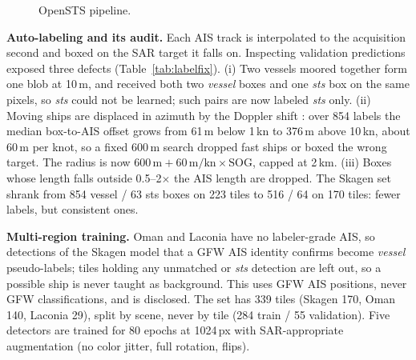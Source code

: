 \documentclass[conference]{IEEEtran}
\begin{document}
\begin{figure}[t]
\centering
{}
\caption{OpenSTS pipeline.}
\label{fig:pipeline}
\end{figure}

\textbf{Auto-labeling and its audit.} Each AIS track is interpolated to the acquisition
second and boxed on the SAR target it falls on. Inspecting validation predictions
exposed three defects (Table~\ref{tab:labelfix}). (i) Two vessels moored together form
one blob at 10\,m, and received both two \emph{vessel} boxes and one \emph{sts} box on
the same pixels, so \emph{sts} could not be learned; such pairs are now labeled
\emph{sts} only. (ii) Moving ships are displaced in azimuth by the Doppler shift
\cite{raney1971}: over 854 labels the median box-to-AIS offset grows from 61\,m below
1\,kn to 376\,m above 10\,kn, about 60\,m per knot, so a fixed 600\,m search dropped fast
ships or boxed the wrong target. The radius is now $600\,\mathrm{m} + 60\,\mathrm{m/kn}
\times \mathrm{SOG}$, capped at 2\,km. (iii) Boxes whose length falls outside
0.5--2$\times$ the AIS length are dropped. The Skagen set shrank from 854 vessel / 63 sts
boxes on 223 tiles to 516 / 64 on 170 tiles: fewer labels, but consistent ones. %

\textbf{Multi-region training.} Oman and Laconia have no labeler-grade AIS, so
detections of the Skagen model that a GFW AIS identity confirms become \emph{vessel}
pseudo-labels; tiles holding any unmatched or \emph{sts} detection are left out, so a
possible ship is never taught as background. This uses GFW AIS positions, never GFW
classifications, and is disclosed. The set has 339 tiles (Skagen 170, Oman 140, Laconia
29), split by scene, never by tile (284 train / 55 validation). Five detectors
\cite{ultralytics,yolo26,rtdetr} are trained for 80 epochs at 1024\,px with SAR-appropriate
augmentation (no color jitter, full rotation, flips). %
\end{document}
